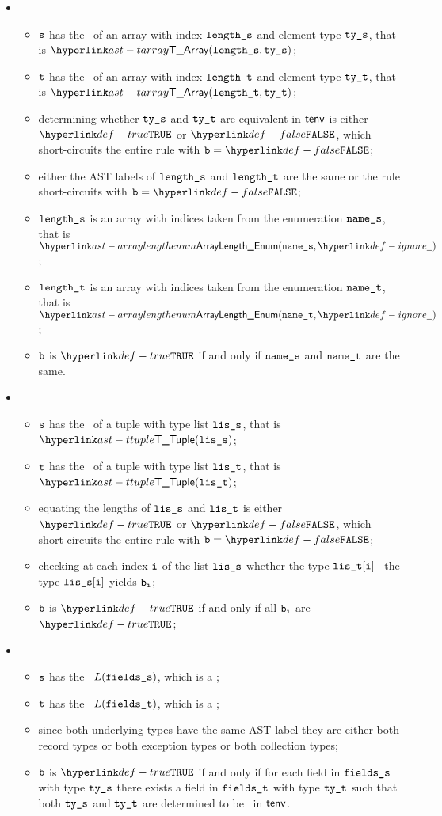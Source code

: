 \begin{itemize}
  \item {}
  \begin{itemize}
  \item $\texttt{s}$ has the \underlyingtype\ of an array with index $\texttt{length\_s}$ and element type $\texttt{ty\_s}$, that is $\TArray(\vlengths, \vtys)$;
  \item $\texttt{t}$ has the \underlyingtype\ of an array with index $\texttt{length\_t}$ and element type $\texttt{ty\_t}$, that is $\TArray(\vlengtht, \vtyt)$;
  \item determining whether $\texttt{ty\_s}$ and $\texttt{ty\_t}$ are equivalent in $\textsf{tenv}$ is either $\True$
  or $\False$, which short-circuits the entire rule with $\vb=\False$;
  \item either the AST labels of $\texttt{length\_s}$ and $\texttt{length\_t}$ are the same or the rule short-circuits with $\vb=\False$;
  \item $\texttt{length\_s}$ is an array with indices taken from the enumeration $\texttt{name\_s}$, that is $\ArrayLengthEnum(\vnames, \Ignore)$;
  \item $\texttt{length\_t}$ is an array with indices taken from the enumeration $\texttt{name\_t}$, that is $\ArrayLengthEnum(\vnamet, \Ignore)$;
  \item $\texttt{b}$ is $\True$ if and only if $\texttt{name\_s}$ and $\texttt{name\_t}$ are the same.
  \end{itemize}

\item {}
  \begin{itemize}
  \item $\texttt{s}$ has the \underlyingtype\ of a tuple with type list $\texttt{lis\_s}$, that is $\TTuple(\vlis)$;
  \item $\texttt{t}$ has the \underlyingtype\ of a tuple with type list $\texttt{lis\_t}$, that is $\TTuple(\vlit)$;
  \item equating the lengths of $\texttt{lis\_s}$ and $\texttt{lis\_t}$ is either $\True$ or $\False$, which short-circuits
  the entire rule with $\vb=\False$;
  \item checking at each index $\texttt{i}$ of the list $\texttt{lis\_s}$ whether the type $\texttt{lis\_t}[\texttt{i}]$ \typesatisfies\ the type $\texttt{lis\_s}[\texttt{i}]$
  yields $\texttt{b}_{\texttt{i}}$\ProseOrTypeError;
  \item $\texttt{b}$ is $\True$ if and only if all $\texttt{b}_{\texttt{i}}$ are $\True$;
  \end{itemize}

\item {}
  \begin{itemize}
  \item $\texttt{s}$ has the \underlyingtype\ $L(\texttt{fields\_s})$, which is a \structuredtype;
  \item $\texttt{t}$ has the \underlyingtype\ $L(\texttt{fields\_t})$, which is a \structuredtype;
  \item since both underlying types have the same AST label they are either both record types or both exception types or both collection types;
  \item $\texttt{b}$ is $\True$ if and only if for each field in $\texttt{fields\_s}$ with type $\texttt{ty\_s}$
  there exists a field in $\texttt{fields\_t}$ with type $\texttt{ty\_t}$ such that both $\texttt{ty\_s}$ and $\texttt{ty\_t}$
  are determined to be \typeequivalent\ in $\textsf{tenv}$.
  \end{itemize}
\end{itemize}

